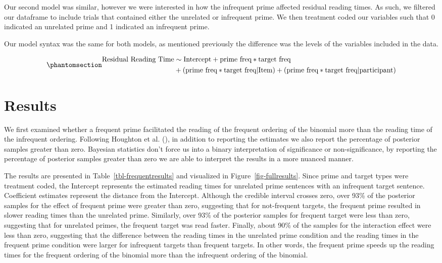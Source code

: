 \documentclass[
  12pt,
]{scrartcl}
\begin{document}
Our second model was similar, however we were interested in how the
infrequent prime affected residual reading times. As such, we filtered
our dataframe to include trials that contained either the unrelated or
infrequent prime. We then treatment coded our variables such that 0
indicated an unrelated prime and 1 indicated an infrequent prime.

Our model syntax was the same for both models, as mentioned previously
the difference was the levels of the variables included in the data.

\begin{equation}\phantomsection\label{eq-models}{
\begin{aligned}
\text{Residual Reading Time} & \sim \text{Intercept} + \text{prime freq} * \text{target freq} \\ 
&+ (\text{prime freq} * \text{target freq} | \text{Item}) + (\text{prime freq} * \text{target freq} | \text{participant})
\end{aligned}
}\end{equation}

\section{Results}\label{results}

We first examined whether a frequent prime facilitated the reading of
the frequent ordering of the binomial more than the reading time of the
infrequent ordering. Following Houghton et al.
(),
in addition to reporting the estimates we also report the percentage of
posterior samples greater than zero. Bayesian statistics don't force us
into a binary interpretation of significance or non-significance, by
reporting the percentage of posterior samples greater than zero we are
able to interpret the results in a more nuanced manner.

The results are presented in Table~\ref{tbl-frequentresults} and
visualized in Figure~\ref{fig-fullresults}. Since prime and target types
were treatment coded, the Intercept represents the estimated reading
times for unrelated prime sentences with an infrequent target sentence.
Coefficient estimates represent the distance from the Intercept.
Although the credible interval crosses zero, over 93\% of the posterior
samples for the effect of frequent prime were greater than zero,
suggesting that for not-frequent targets, the frequent prime resulted in
slower reading times than the unrelated prime. Similarly, over 93\% of
the posterior samples for frequent target were less than zero,
suggesting that for unrelated primes, the frequent target was read
faster. Finally, about 90\% of the samples for the interaction effect
were less than zero, suggesting that the difference between the reading
times in the unrelated prime condition and the reading times in the
frequent prime condition were larger for infrequent targets than
frequent targets. In other words, the frequent prime speeds up the
reading times for the frequent ordering of the binomial more than the
infrequent ordering of the binomial.
\end{document}
